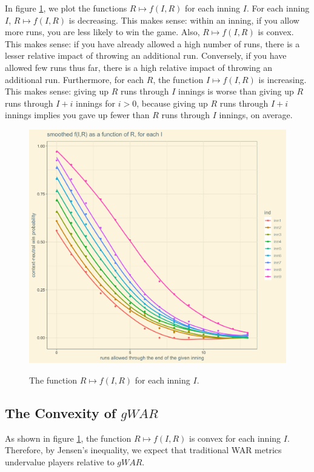 \documentclass[12pt]{article}
\begin{document}
In figure \ref{fig:fR}, we plot the functions $R \mapsto f(I,R)$ for each inning $I$. For each inning $I$, $R \mapsto f(I,R)$ is decreasing. This makes sense: within an inning, if you allow more runs, you are less likely to win the game. Also, $R \mapsto f(I,R)$ is convex. This makes sense: if you have already allowed a high number of runs, there is a lesser relative impact of throwing an additional run. Conversely, if you have allowed few runs thus far, there is a high relative impact of throwing an additional run. Furthermore, for each $R$, the function $I \mapsto f(I,R)$ is increasing. This makes sense: giving up $R$ runs through $I$ innings is worse than giving up $R$ runs through $I+i$ innings for $i > 0$, because giving up $R$ runs through $I+i$ innings implies you gave up fewer than $R$ runs through $I$ innings, on average.

\begin{figure}[t!]
\centering
\caption{The function $R \mapsto f(I,R)$ for each inning $I$.} 
\includegraphics[width=15cm]{../writeup_plots/plot_fIR_R_smoothed.png}
\label{fig:fR}
\end{figure}

\subsection{The Convexity of $gWAR$}\label{sec:convexityOfWAR}

As shown in figure \ref{fig:fR}, the function $R \mapsto f(I,R)$ is convex for each inning $I$. Therefore, by Jensen's inequality, we expect that traditional WAR metrics undervalue players relative to $gWAR$. 
\end{document}
